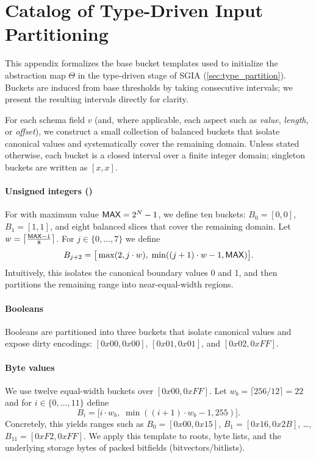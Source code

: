 \section{Catalog of Type-Driven Input Partitioning}\label{apdx:typp}


This appendix formalizes the base bucket templates used to initialize the abstraction map $\Theta$ in the type-driven stage of SGIA (\autoref{sec:type_partition}). Buckets are induced from base thresholds by taking consecutive intervals; we present the resulting intervals directly for clarity.

For each schema field $v$ (and, where applicable, each aspect such as \emph{value}, \emph{length}, or \emph{offset}), we construct a small collection of balanced buckets that isolate canonical values and systematically cover the remaining domain.
Unless stated otherwise, each bucket is a closed interval over a finite integer domain; singleton buckets are written as $[x,x]$.

\paragraph{Unsigned integers ()}
For  with maximum value ${\sf MAX}=2^N-1$, we define ten buckets: $B_0=[0,0]$, $B_1=[1,1]$, and eight balanced slices that cover the remaining domain.
Let $w = \left\lceil \frac{{\sf MAX}-1}{8} \right\rceil$.
For $j\in\{0,\ldots,7\}$ we define
\[
  B_{j+2} = \big[\max(2, j\cdot w),\; \min((j+1)\cdot w - 1, {\sf MAX})\big].
\]
Intuitively, this isolates the canonical boundary values 0 and 1, and then partitions the remaining range into near-equal-width regions.

\paragraph{Booleans}
Booleans are partitioned into three buckets that isolate canonical values and expose dirty encodings:
$[0x00,0x00]$, $[0x01,0x01]$, and $[0x02,0xFF]$.

\paragraph{Byte values}
We use twelve equal-width buckets over $[0x00,0xFF]$.
Let $w_b = \lceil 256/12 \rceil = 22$ and for $i\in\{0,\ldots,11\}$ define
\[
  B_i = \big[i\cdot w_b,\; \min((i+1)\cdot w_b - 1, 255)\big].
\]
Concretely, this yields ranges such as $B_0=[0x00,0x15]$, $B_1=[0x16,0x2B]$, \dots, $B_{11}=[0xF2,0xFF]$.
We apply this template to roots, byte lists, and the underlying storage bytes of packed bitfields (bitvectors/bitlists).

